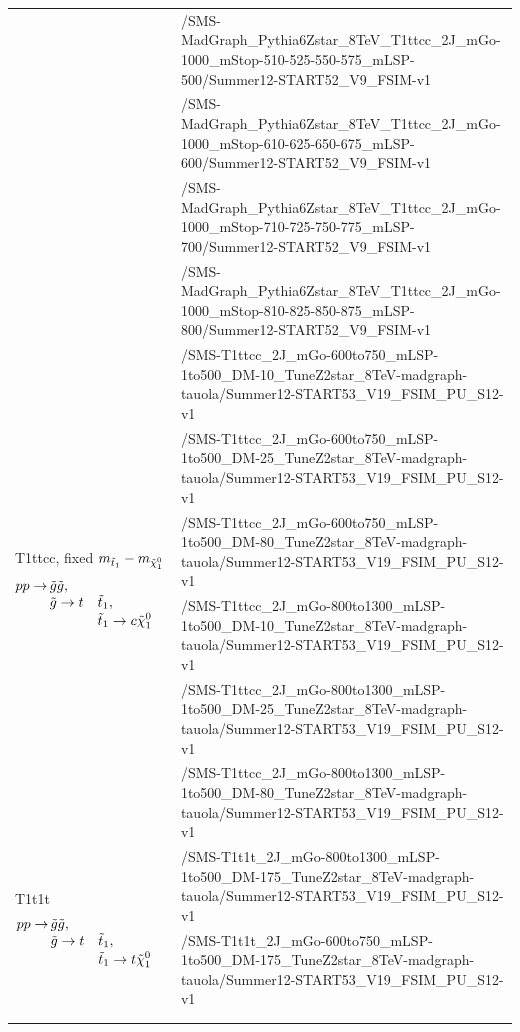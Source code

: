 \begin{table}
\begin{center}
\begin{tabular}{l l}
&/SMS-MadGraph\_Pythia6Zstar\_8TeV\_T1ttcc\_2J\_mGo-1000\_mStop-510-525-550-575\_mLSP-500/Summer12-START52\_V9\_FSIM-v1 \\
&/SMS-MadGraph\_Pythia6Zstar\_8TeV\_T1ttcc\_2J\_mGo-1000\_mStop-610-625-650-675\_mLSP-600/Summer12-START52\_V9\_FSIM-v1 \\
&/SMS-MadGraph\_Pythia6Zstar\_8TeV\_T1ttcc\_2J\_mGo-1000\_mStop-710-725-750-775\_mLSP-700/Summer12-START52\_V9\_FSIM-v1 \\
&/SMS-MadGraph\_Pythia6Zstar\_8TeV\_T1ttcc\_2J\_mGo-1000\_mStop-810-825-850-875\_mLSP-800/Summer12-START52\_V9\_FSIM-v1 \\
\midrule
\multirow{6}{4cm}{T1ttcc, fixed $m_{\tilde{t}_1} - m_{\tilde{\chi}_1^0}$
\begin{alignat*}{3}
pp \rightarrow\, &\tilde{g} \tilde{g}, \\[-3pt]
                   &\tilde{g} \rightarrow t &&\tilde{t}_1, \\[-3pt]
                   &                        &&\tilde{t}_1 \rightarrow c \tilde{\chi}_1^0
\end{alignat*}}
&/SMS-T1ttcc\_2J\_mGo-600to750\_mLSP-1to500\_DM-10\_TuneZ2star\_8TeV-madgraph-tauola/Summer12-START53\_V19\_FSIM\_PU\_S12-v1 \\
&/SMS-T1ttcc\_2J\_mGo-600to750\_mLSP-1to500\_DM-25\_TuneZ2star\_8TeV-madgraph-tauola/Summer12-START53\_V19\_FSIM\_PU\_S12-v1 \\
&/SMS-T1ttcc\_2J\_mGo-600to750\_mLSP-1to500\_DM-80\_TuneZ2star\_8TeV-madgraph-tauola/Summer12-START53\_V19\_FSIM\_PU\_S12-v1 \\
&/SMS-T1ttcc\_2J\_mGo-800to1300\_mLSP-1to500\_DM-10\_TuneZ2star\_8TeV-madgraph-tauola/Summer12-START53\_V19\_FSIM\_PU\_S12-v1 \\
&/SMS-T1ttcc\_2J\_mGo-800to1300\_mLSP-1to500\_DM-25\_TuneZ2star\_8TeV-madgraph-tauola/Summer12-START53\_V19\_FSIM\_PU\_S12-v1 \\
&/SMS-T1ttcc\_2J\_mGo-800to1300\_mLSP-1to500\_DM-80\_TuneZ2star\_8TeV-madgraph-tauola/Summer12-START53\_V19\_FSIM\_PU\_S12-v1 \\
\midrule
\multirow{4}{4cm}{T1t1t
\vspace{-1.5ex}
\begin{alignat*}{3}
pp \rightarrow\, &\tilde{g} \tilde{g}, \\[-3pt]
                   &\tilde{g} \rightarrow t &&\tilde{t}_1, \\[-3pt]
                   &                        &&\tilde{t}_1 \rightarrow t \tilde{\chi}_1^0
\end{alignat*}}
&/SMS-T1t1t\_2J\_mGo-800to1300\_mLSP-1to500\_DM-175\_TuneZ2star\_8TeV-madgraph-tauola/Summer12-START53\_V19\_FSIM\_PU\_S12-v1 \\
&/SMS-T1t1t\_2J\_mGo-600to750\_mLSP-1to500\_DM-175\_TuneZ2star\_8TeV-madgraph-tauola/Summer12-START53\_V19\_FSIM\_PU\_S12-v1 \\
& \\
& \\
\bottomrule
\end{tabular}
\end{center}
\label{tab:boost_mc_sms}
\end{table}
